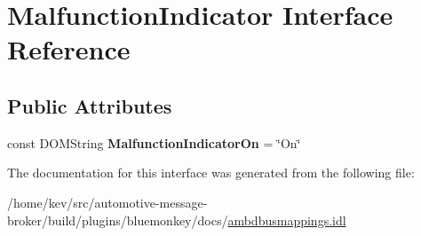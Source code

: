 \hypertarget{interfaceMalfunctionIndicator}{\section{Malfunction\+Indicator Interface Reference}
\label{interfaceMalfunctionIndicator}
}
\subsection*{Public Attributes}
\begin{DoxyCompactItemize}
\item 
\hypertarget{interfaceMalfunctionIndicator_a64d7768c2dfc5a36402bd7f6c57a1a31}{const D\+O\+M\+String {\bfseries Malfunction\+Indicator\+On} = \char`\"{}On\char`\"{}}\label{interfaceMalfunctionIndicator_a64d7768c2dfc5a36402bd7f6c57a1a31}

\end{DoxyCompactItemize}


The documentation for this interface was generated from the following file\+:\begin{DoxyCompactItemize}
\item 
/home/kev/src/automotive-\/message-\/broker/build/plugins/bluemonkey/docs/\hyperlink{ambdbusmappings_8idl}{ambdbusmappings.\+idl}\end{DoxyCompactItemize}
